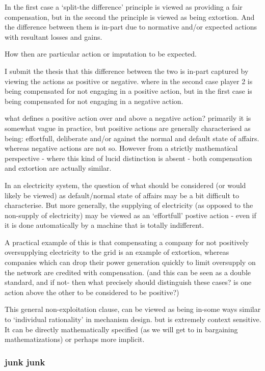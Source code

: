 In the first case a `split-the difference' principle is viewed as providing a fair compensation, but in the second the principle is viewed as being extortion.
And the difference between them is in-part due to normative and/or expected actions with resultant losses and gains.

How then are particular action or imputation to be expected.

I submit the thesis that this difference between the two is in-part captured by viewing the actions as positive or negative. where in the second case player 2 is being compensated for not engaging in a positive action, but in the first case is being compensated for not engaging in a negative action.

what defines a positive action over and above a negative action?
primarily it is somewhat vague in practice, but positive actions are generally characterised as being: effortfull, deliberate and/or against the normal and default state of affairs. whereas negative actions are not so.
However from a strictly mathematical perspective - where this kind of lucid distinction is absent - both compensation and extortion are actually similar.

In an electricity system, the question of what should be considered (or would likely be viewed) as default/normal state of affairs may be a bit difficult to characterise.
But more generally, the supplying of electricity (as opposed to the non-supply of electricity) may be viewed as an `effortfull' postive action - even if it is done automatically by a machine that is totally indifferent.

A practical example of this is that compensating a company for not positively oversupplying electricity to the grid is an example of extortion, whereas companies which can drop their power generation quickly to limit oversupply on the network are credited with compensation. (and this can be seen as a double standard, and if not- then what precisely should distinguish these cases? is one action above the other to be considered to be positive?)

This general non-exploitation clause, can be viewed as being in-some ways similar to `individual rationality' in mechanism design. but is extremely context sensitive.
It can be directly mathematically specified (as we will get to in bargaining mathematizations) or perhaps more implicit.




\subsubsection{junk junk}



